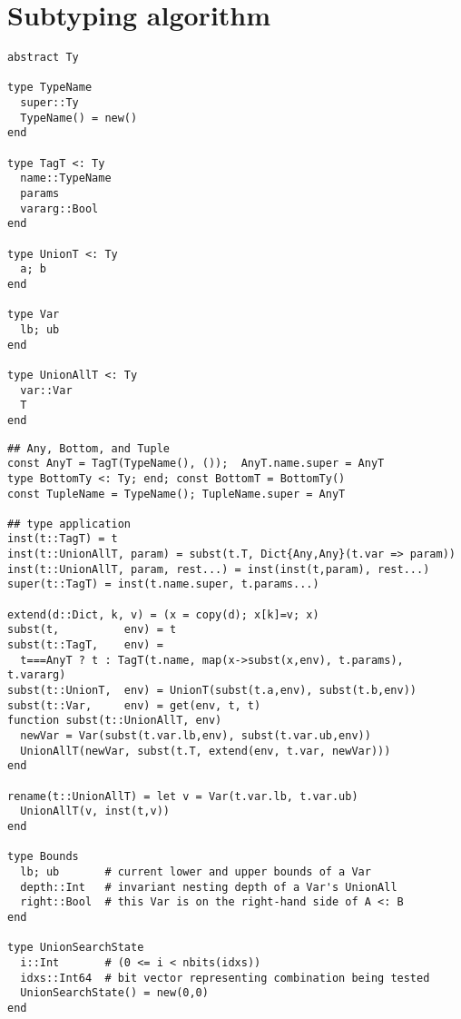 \chapter{Subtyping algorithm}

\begin{singlespace}
\begin{multicols}{2}
\begin{lstlisting}[style=customjulia]
abstract Ty

type TypeName
  super::Ty
  TypeName() = new()
end

type TagT <: Ty
  name::TypeName
  params
  vararg::Bool
end

type UnionT <: Ty
  a; b
end

type Var
  lb; ub
end

type UnionAllT <: Ty
  var::Var
  T
end
\end{lstlisting}
\end{multicols}

\vspace{-3ex}
\begin{lstlisting}[style=customjulia]
## Any, Bottom, and Tuple
const AnyT = TagT(TypeName(), ());  AnyT.name.super = AnyT
type BottomTy <: Ty; end; const BottomT = BottomTy()
const TupleName = TypeName(); TupleName.super = AnyT

## type application
inst(t::TagT) = t
inst(t::UnionAllT, param) = subst(t.T, Dict{Any,Any}(t.var => param))
inst(t::UnionAllT, param, rest...) = inst(inst(t,param), rest...)
super(t::TagT) = inst(t.name.super, t.params...)

extend(d::Dict, k, v) = (x = copy(d); x[k]=v; x)
subst(t,          env) = t
subst(t::TagT,    env) =
  t===AnyT ? t : TagT(t.name, map(x->subst(x,env), t.params), t.vararg)
subst(t::UnionT,  env) = UnionT(subst(t.a,env), subst(t.b,env))
subst(t::Var,     env) = get(env, t, t)
function subst(t::UnionAllT, env)
  newVar = Var(subst(t.var.lb,env), subst(t.var.ub,env))
  UnionAllT(newVar, subst(t.T, extend(env, t.var, newVar)))
end

rename(t::UnionAllT) = let v = Var(t.var.lb, t.var.ub)
  UnionAllT(v, inst(t,v))
end

type Bounds
  lb; ub       # current lower and upper bounds of a Var
  depth::Int   # invariant nesting depth of a Var's UnionAll
  right::Bool  # this Var is on the right-hand side of A <: B
end

type UnionSearchState
  i::Int       # (0 <= i < nbits(idxs))
  idxs::Int64  # bit vector representing combination being tested
  UnionSearchState() = new(0,0)
end


\end{lstlisting}
\end{singlespace}

